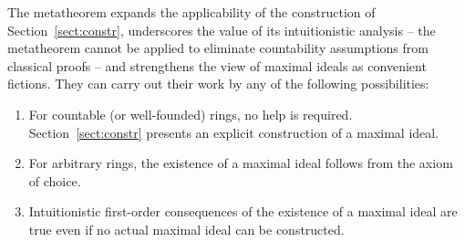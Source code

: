 \documentclass[oneside,reqno]{amsart}
\theoremstyle{definition}
\theoremstyle{plain}
\theoremstyle{remark}
\renewcommand{\_}{\mathpunct{.}\,}
\begin{document}
The metatheorem expands the applicability of the construction of
Section~\ref{sect:constr}, underscores the value of its intuitionistic
analysis -- the metatheorem cannot be applied to eliminate countability assumptions from classical proofs --
and strengthens the
view of maximal ideals as convenient fictions. They can
carry out their work by any of the following possibilities:
\begin{enumerate}
\item For countable (or well-founded) rings, no help is required.
Section~\ref{sect:constr} presents an explicit construction of a maximal ideal.
\item For arbitrary rings, the existence of a maximal ideal follows from the
axiom of choice.
\item Intuitionistic first-order consequences of the existence of a maximal
ideal are true even if no actual maximal ideal can be constructed.
\end{enumerate}


\printbibliography
\end{document}
